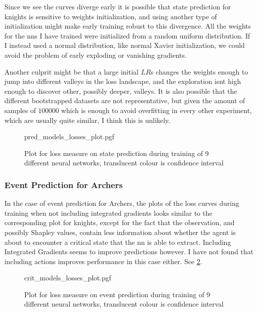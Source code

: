 \documentclass[UKenglish]{uiomasterthesis}
\begin{document}
Since we see the curves diverge early it is possible that state prediction for knights is sensitive to weights initialization, and using another type of initialization might make early training robust to this divergence. All the weights for the \acp{nn} I have trained were initialized from a random uniform distribution. If I instead used a normal distribution, like normal Xavier initialization, we could avoid the problem of early exploding or vanishing gradients\cite{xavier_init}.

Another culprit might be that a large initial $LR$s changes the weights enough to jump into different valleys in the loss landscape, and the exploration isnt high enough to discover other, possibly deeper, valleys. It is also possible that the different bootstrapped datasets are not representative, but given the amount of samples of $100000$ which is enough to avoid overfitting in every other experiment, which are usually quite similar, I think this is unlikely.

\begin{figure}[hbtp]
\centering
{pred_models_losses_plot.pgf}
\caption{Plot for loss measure on state prediction during training of 9 different neural networks, translucent colour is confidence interval}
\label{fig:state_knight_losses}
\end{figure}

\subsubsection{Event Prediction for Archers}

In the case of event prediction for Archers, the plots of the loss curves during training when not including integrated gradients looks similar to the corresponding plot for knights, except for the fact that the observation, and possibly Shapley values, contain less information about whether the agent is about to encounter a critical state that the \ac{nn} is able to extract. Including Integrated Gradients seems to improve predictions however. I have not found that including actions improves performance in this case either. See \cref{fig:event_archer_losses}.

\begin{figure}[hbtp]
\centering
{crit_models_losses_plot.pgf}
\caption{Plot for loss measure on event prediction during training of 9 different neural networks, translucent colour is confidence interval}
\label{fig:event_archer_losses}
\end{figure}
\end{document}
